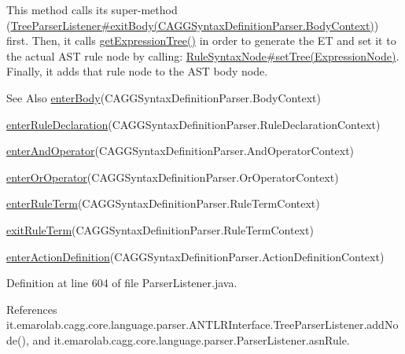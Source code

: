 This method calls its super-\/method (\hyperlink{}{Tree\-Parser\-Listener\#exit\-Body(\-C\-A\-G\-G\-Syntax\-Definition\-Parser.\-Body\-Context)}) first. Then, it calls \hyperlink{classit_1_1emarolab_1_1cagg_1_1core_1_1language_1_1parser_1_1ANTLRInterface_1_1TreeParserListener_a0606f9a99fdfe3c9f329f3ba1e012001}{get\-Expression\-Tree()} in order to generate the E\-T and set it to the actual A\-S\-T rule node by calling\-: \hyperlink{}{Rule\-Syntax\-Node\#set\-Tree(\-Expression\-Node)}. Finally, it adds that rule node to the A\-S\-T body node. \begin{DoxySeeAlso}{See Also}
\hyperlink{classit_1_1emarolab_1_1cagg_1_1core_1_1language_1_1parser_1_1ParserListener_a9675dd98156b94a9e26cea3946eaa69d}{enter\-Body}(C\-A\-G\-G\-Syntax\-Definition\-Parser.\-Body\-Context) 

\hyperlink{classit_1_1emarolab_1_1cagg_1_1core_1_1language_1_1parser_1_1ParserListener_a23734ed11648eae22a037a43e8c2d007}{enter\-Rule\-Declaration}(C\-A\-G\-G\-Syntax\-Definition\-Parser.\-Rule\-Declaration\-Context) 

\hyperlink{classit_1_1emarolab_1_1cagg_1_1core_1_1language_1_1parser_1_1ParserListener_a27394515e7347376dc937974202abbc9}{enter\-And\-Operator}(C\-A\-G\-G\-Syntax\-Definition\-Parser.\-And\-Operator\-Context) 

\hyperlink{classit_1_1emarolab_1_1cagg_1_1core_1_1language_1_1parser_1_1ParserListener_a0c20b78d0166b7fe8cf816764d9c7c86}{enter\-Or\-Operator}(C\-A\-G\-G\-Syntax\-Definition\-Parser.\-Or\-Operator\-Context) 

\hyperlink{classit_1_1emarolab_1_1cagg_1_1core_1_1language_1_1parser_1_1ParserListener_ab55244dd0bc74c42338389ef4f186963}{enter\-Rule\-Term}(C\-A\-G\-G\-Syntax\-Definition\-Parser.\-Rule\-Term\-Context) 

\hyperlink{classit_1_1emarolab_1_1cagg_1_1core_1_1language_1_1parser_1_1ParserListener_a9cddde49b7fd2142b1fcd72b5d6e2c51}{exit\-Rule\-Term}(C\-A\-G\-G\-Syntax\-Definition\-Parser.\-Rule\-Term\-Context) 

\hyperlink{classit_1_1emarolab_1_1cagg_1_1core_1_1language_1_1parser_1_1ParserListener_a95c6463441d582fef5d63aea4eb13f56}{enter\-Action\-Definition}(C\-A\-G\-G\-Syntax\-Definition\-Parser.\-Action\-Definition\-Context) 
\end{DoxySeeAlso}


Definition at line 604 of file Parser\-Listener.\-java.



References it.\-emarolab.\-cagg.\-core.\-language.\-parser.\-A\-N\-T\-L\-R\-Interface.\-Tree\-Parser\-Listener.\-add\-Node(), and it.\-emarolab.\-cagg.\-core.\-language.\-parser.\-Parser\-Listener.\-asn\-Rule.



